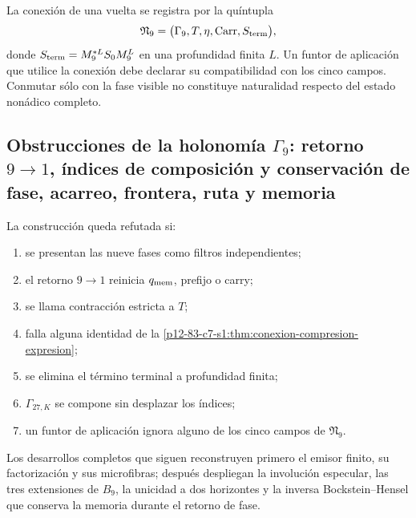 La conexión de una vuelta se registra por la quíntupla
\[
 \mathfrak N_9=
 \bigl(\Gamma_9,T,\eta,\operatorname{Carr},S_{\rm term}\bigr),
\]
donde \(S_{\rm term}=M_9^{*L}S_0M_9^L\) en una profundidad finita
\(L\). Un funtor de aplicación que utilice la conexión debe declarar su
compatibilidad con los cinco campos. Conmutar sólo con la fase visible no
constituye naturalidad respecto del estado nonádico completo.

\subsection{Obstrucciones de la holonomía \(\Gamma_9\): retorno \(9\to1\), índices de composición y conservación de fase, acarreo, frontera, ruta y memoria}

\begin{criterion}
La construcción queda refutada si:
\begin{enumerate}
 \item se presentan las nueve fases como filtros independientes;
 \item el retorno \(9\to1\) reinicia \(q_{\rm mem}\), prefijo o carry;
 \item se llama contracción estricta a \(T\);
 \item falla alguna identidad de la
       \cref{p12-83-c7-s1:thm:conexion-compresion-expresion};
 \item se elimina el término terminal a profundidad finita;
 \item \(\Gamma_{27,K}\) se compone sin desplazar los índices;
 \item un funtor de aplicación ignora alguno de los cinco campos de
       \(\mathfrak N_9\).
\end{enumerate}
\end{criterion}

Los desarrollos completos que siguen reconstruyen primero el emisor finito,
su factorización y sus microfibras; después despliegan la involución
especular, las tres extensiones de \(B_9\), la unicidad a dos horizontes y la
inversa Bockstein--Hensel que conserva la memoria durante el retorno de fase.

\begin{HMTScientificOwnerSubordinated}

\end{HMTScientificOwnerSubordinated}

\begin{HMTScientificOwnerSubordinated}

\end{HMTScientificOwnerSubordinated}
